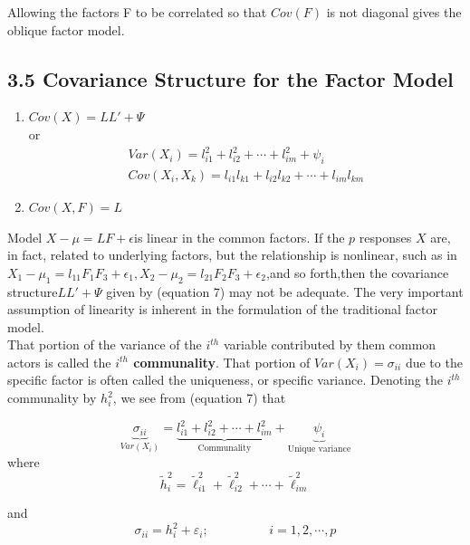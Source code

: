 \documentclass[12pt]{article}
\begin{document}
\noindent Allowing the factors F to be correlated so that $Cov (F)$ is not diagonal gives the oblique factor model.



\subsection*{3.5 Covariance Structure for the  Factor Model}
\begin{enumerate}
	\item $Cov(X)= LL' +\Psi$ \\
	or
	\begin{equation}
		\begin{aligned}
			Var(X_i)= l_{i1}^2 + l_{i2}^2 + \cdots +l_{im}^2 + \psi_i \\
			Cov(X_i, X_k) = l_{i1}l_{k1} + l_{i2}l_{k2} + \cdots +l_{im}l_{km}
		\end{aligned}
	\end{equation}
	
	\item $Cov(X,F)= L$
\end{enumerate}

\noindent Model $X-\mu = LF + \epsilon $is linear in the common factors. If the $p$ responses $X$ are, in fact, related to underlying factors, but the relationship is nonlinear, such as in $ X_1 -\mu_1= l_{11}F_1F_3 + \epsilon_1, X_2 -\mu_2= l_{21}F_2F_3 + \epsilon_2$,and so forth,then the covariance structure$LL' + \Psi $ given by (equation 7) may not be adequate. The very important assumption of linearity is inherent in the formulation of the traditional factor model. \\

\noindent That portion of the variance of the $i^{th}$ variable contributed by them common actors is called the \textbf{$i^{th}$ communality}. That portion of $Var (X_i) = \sigma_{ii}$ due to the specific factor is often called the uniqueness, or specific variance. Denoting the $i^{th}$ communality by $h_i^2$, we see from (equation 7) that

\begin{equation}
	\underbrace{\sigma_{ii}}_{Var(X_i)}= \underbrace{l_{i1}^2 + l_{i2}^2 + \cdots +l_{im}^2}_\text{Communality} +\underbrace{\psi_i}_\text{Unique variance}
\end{equation}
where
$$
\widetilde{h}_i^2=\tilde{\ell}_{i 1}^2+\tilde{\ell}_{i 2}^2+\cdots+\tilde{\ell}_{i m}^2
$$

and 
$$\sigma_{ii}= h_i^2 + \varepsilon_i ; \hspace{2cm} i= 1,2, \cdots , p$$
\end{document}
